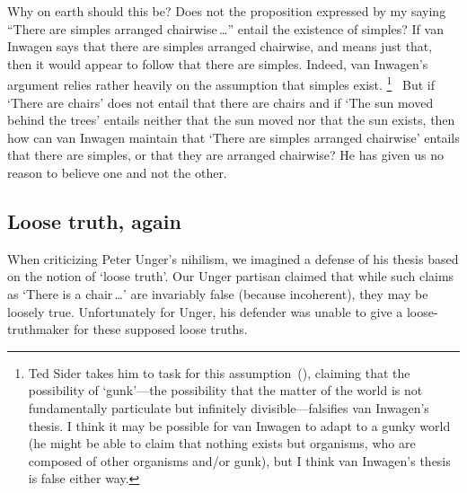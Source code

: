 \documentclass[11pt]{article}
\begin{document}
\begin{spacing}{1.5}
Why on earth should this be? Does not the proposition expressed by my
saying ``There are simples arranged chairwise\,\ldots '' entail the
existence of simples?  If van Inwagen says that there are simples
arranged chairwise, and means just that, then it would appear to
follow that there are simples.  Indeed, van Inwagen's argument relies
rather heavily on the assumption that simples exist.
%
\footnote{Ted Sider takes him to task for this
  assumption~(\citeyear{sider1993}), claiming that the possibility of
  `gunk'---the possibility that the matter of the world is not
  fundamentally particulate but infinitely divisible---falsifies van
  Inwagen's thesis.  I think it may be possible for van Inwagen to
  adapt to a gunky world (he might be able to claim that nothing
  exists but organisms, who are composed of other organisms and/or
  gunk), but I think van Inwagen's thesis is false either way.}
%
\ But if `There are chairs' does not entail that there are chairs and
if `The sun moved behind the trees' entails neither that the sun moved
nor that the sun exists, then how can van Inwagen maintain that `There
are simples arranged chairwise' entails that there are simples, or
that they are arranged chairwise?  He has given us no reason to
believe one and not the other.

\subsection{Loose truth, again}
\label{loose-v}
When criticizing Peter Unger's nihilism, we imagined a defense of his
thesis based on the notion of `loose truth'.  Our Unger partisan
claimed that while such claims as `There is a chair\,\ldots ' are
invariably false (because incoherent), they may be loosely true.
Unfortunately for Unger, his defender was unable to give a
loose-truthmaker for these supposed loose truths.


\end{spacing}
\end{document}
